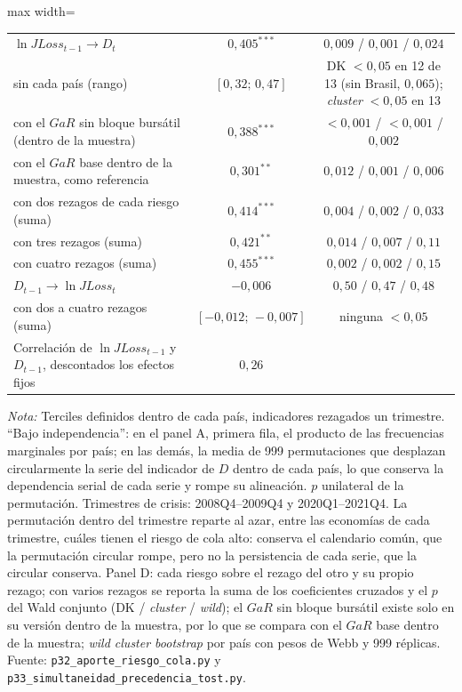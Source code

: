 \begin{table}[htbp]
\begin{adjustbox}{max width=\linewidth}
\begin{tabular}{l ccc}
\quad $\ln JLoss_{t-1}\to D_t$ & $0{,}405^{***}$ & \multicolumn{2}{c}{$0{,}009$ / $0{,}001$ / $0{,}024$} \\
\quad \quad sin cada país (rango) & $[0{,}32;\,0{,}47]$ & \multicolumn{2}{c}{DK $<0{,}05$ en 12 de 13 (sin Brasil, $0{,}065$); \textit{cluster} $<0{,}05$ en 13} \\
\quad \quad con el $GaR$ sin bloque bursátil (dentro de la muestra) & $0{,}388^{***}$ & \multicolumn{2}{c}{$<0{,}001$ / $<0{,}001$ / $0{,}002$} \\
\quad \quad con el $GaR$ base dentro de la muestra, como referencia & $0{,}301^{**}$ & \multicolumn{2}{c}{$0{,}012$ / $0{,}001$ / $0{,}006$} \\
\quad \quad con dos rezagos de cada riesgo (suma) & $0{,}414^{***}$ & \multicolumn{2}{c}{$0{,}004$ / $0{,}002$ / $0{,}033$} \\
\quad \quad con tres rezagos (suma) & $0{,}421^{**}$ & \multicolumn{2}{c}{$0{,}014$ / $0{,}007$ / $0{,}11$} \\
\quad \quad con cuatro rezagos (suma) & $0{,}455^{***}$ & \multicolumn{2}{c}{$0{,}002$ / $0{,}002$ / $0{,}15$} \\
\quad $D_{t-1}\to\ln JLoss_t$ & $-0{,}006$ & \multicolumn{2}{c}{$0{,}50$ / $0{,}47$ / $0{,}48$} \\
\quad \quad con dos a cuatro rezagos (suma) & $[-0{,}012;\,-0{,}007]$ & \multicolumn{2}{c}{ninguna $<0{,}05$} \\
\quad Correlación de $\ln JLoss_{t-1}$ y $D_{t-1}$, descontados los efectos fijos & $0{,}26$ & & \\
\bottomrule
\end{tabular}
\end{adjustbox}
\par\smallskip\parbox{0.95\linewidth}{\footnotesize \textit{Nota:} Terciles definidos dentro de cada país, indicadores rezagados un trimestre. ``Bajo independencia'': en el panel A, primera fila, el producto de las frecuencias marginales por país; en las demás, la media de 999 permutaciones que desplazan circularmente la serie del indicador de $D$ dentro de cada país, lo que conserva la dependencia serial de cada serie y rompe su alineación. $p$ unilateral de la permutación. Trimestres de crisis: 2008Q4--2009Q4 y 2020Q1--2021Q4. La permutación dentro del trimestre reparte al azar, entre las economías de cada trimestre, cuáles tienen el riesgo de cola alto: conserva el calendario común, que la permutación circular rompe, pero no la persistencia de cada serie, que la circular conserva. Panel D: cada riesgo sobre el rezago del otro y su propio rezago; con varios rezagos se reporta la suma de los coeficientes cruzados y el $p$ del Wald conjunto (DK / \textit{cluster} / \textit{wild}); el $GaR$ sin bloque bursátil existe solo en su versión dentro de la muestra, por lo que se compara con el $GaR$ base dentro de la muestra; \textit{wild cluster bootstrap} por país con pesos de Webb y 999 réplicas. Fuente: \texttt{p32\_aporte\_riesgo\_cola.py} y \texttt{p33\_simultaneidad\_precedencia\_tost.py}.}
\end{table}

